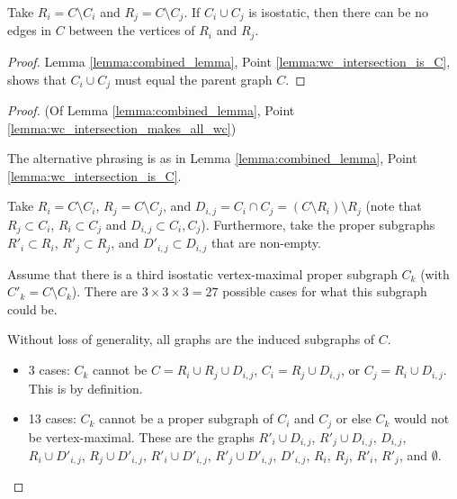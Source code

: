 \begin{observation}\label{observation:no_edges_between_diff}
Take $R_i=C\setminus C_i$ and $R_j=C\setminus C_j$. If $C_i\cup C_j$ is isostatic, then there can be no edges in $C$ between the vertices of $R_i$ and $R_j$.
\end{observation}

\begin{proof}
Lemma \ref{lemma:combined_lemma}, Point \ref{lemma:wc_intersection_is_C}, shows that $C_i\cup C_j$ must equal the parent graph $C$.
\end{proof}


\begin{proof} (Of Lemma \ref{lemma:combined_lemma}, Point \ref{lemma:wc_intersection_makes_all_wc})

The alternative phrasing is as in Lemma \ref{lemma:combined_lemma}, Point \ref{lemma:wc_intersection_is_C}.

Take $R_i=C\setminus C_i$, $R_j=C\setminus C_j$, and $D_{i,j}=C_i\cap C_j=(C\setminus R_i)\setminus R_j$ (note that $R_j\subset C_i$, $R_i\subset C_j$ and $D_{i,j}\subset C_i,C_j$). Furthermore, take the proper subgraphs $R'_i\subset R_i$, $R'_j\subset R_j$, and $D'_{i,j}\subset D_{i,j}$ that are non-empty.

Assume that there is a third isostatic vertex-maximal proper subgraph $C_k$ (with $C'_k=C\setminus C_k$). There are $3\times 3\times 3 = 27$ possible cases for what this subgraph could be.

Without loss of generality, all graphs are the induced subgraphs of $C$.


\newcommand{\inducedOnC}[1]{#1}

\begin{itemize}
    \item 3 cases: $C_k$ cannot be $C=\inducedOnC{R_i\cup R_j\cup D_{i,j}}$, $C_i=\inducedOnC{R_j\cup D_{i,j}}$, or $C_j=\inducedOnC{R_i\cup D_{i,j}}$. This is by definition.

    \item 13 cases: $C_k$ cannot be a proper subgraph of $C_i$ and $C_j$ or else $C_k$ would not be vertex-maximal. These are the graphs $\inducedOnC{R'_i\cup D_{i,j}}$, $\inducedOnC{R'_j\cup D_{i,j}}$, $\inducedOnC{ D_{i,j}}$, $\inducedOnC{R_i\cup D'_{i,j}}$, $\inducedOnC{R_j\cup D'_{i,j}}$, $\inducedOnC{R'_i\cup D'_{i,j}}$, $\inducedOnC{R'_j\cup D'_{i,j}}$, $\inducedOnC{ D'_{i,j}}$, $\inducedOnC{R_i}$, $\inducedOnC{R_j}$, $\inducedOnC{R'_i}$, $\inducedOnC{R'_j}$, and $\inducedOnC{\emptyset}$.


\end{itemize}
\end{proof}
